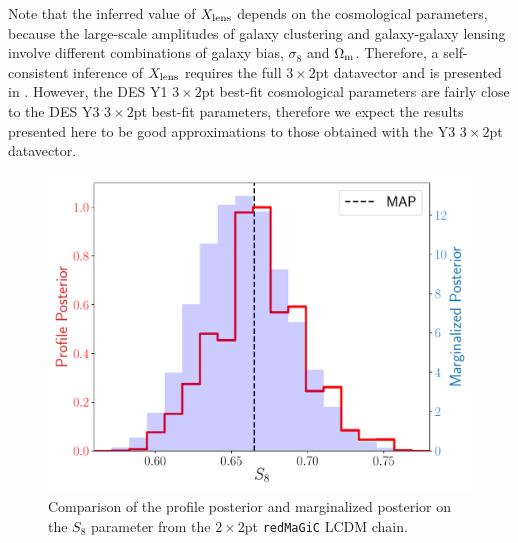 \documentclass[aps, prd,twocolumn,superscriptaddress,nofootinbib,preprintnumbers]{revtex4-1}
\newcommand{\redmagic}{\texttt{redMaGiC} }
\begin{document}
Note that the inferred value of $X_{\rm lens}$ depends on the cosmological parameters, because the large-scale amplitudes of galaxy clustering and galaxy-galaxy lensing involve different combinations of galaxy bias, $\sigma_8$ and $\Omega_{\rm m}$. Therefore, a self-consistent inference of $X_{\rm lens}$ requires the full $3\times2$pt datavector and is presented in \citet*{y3-3x2ptkp}. However, the DES Y1 $3\times2$pt best-fit cosmological parameters are fairly close to the DES Y3 $3\times2$pt best-fit parameters, therefore we expect  the results presented here to be good approximations to those obtained with the Y3 $3\times2$pt datavector. 




\begin{figure}
\includegraphics[width=\columnwidth]{figs/profile_likelihood_emcee.pdf}
\caption[]{Comparison of the profile posterior and marginalized posterior on the $S_8$ parameter from the $2\times2$pt \redmagic LCDM chain.}
\label{fig:prof_like}
\end{figure}
\end{document}
